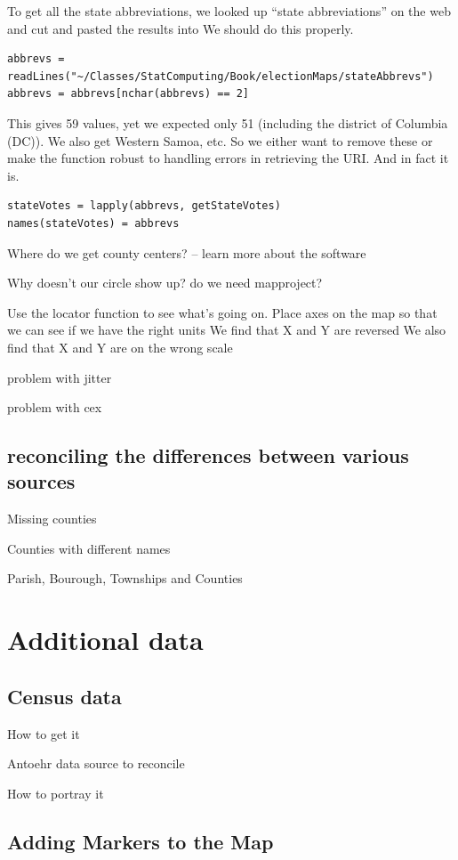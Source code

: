To get all the state abbreviations, we looked up ``state
abbreviations'' on the web and cut and pasted the results into
We should do this properly.
\begin{verbatim}
abbrevs = readLines("~/Classes/StatComputing/Book/electionMaps/stateAbbrevs")
abbrevs = abbrevs[nchar(abbrevs) == 2]
\end{verbatim}
This gives 59 values, yet we expected only 51 (including the
district of Columbia (DC)). We also get Western Samoa, etc.
So we either want to remove these or make the function
robust to handling errors in retrieving the URI.
And in fact it is.
\begin{verbatim}
stateVotes = lapply(abbrevs, getStateVotes)
names(stateVotes) = abbrevs
\end{verbatim}


Where do we get county centers?  -- learn more about the software

Why doesn't our circle show up?
do we need mapproject?

Use the locator function to see what's going on.
Place axes on the map so that we can see if we have the right units
We find that X and Y are reversed
We also find that X and Y are on the wrong scale

problem with jitter

problem with cex

\subsection{reconciling the differences between various sources}

Missing counties

Counties with different names

Parish, Bourough, Townships and Counties


\section{Additional data}

\subsection{Census data}
How to get it

Antoehr data source to reconcile

How to portray it

\subsection{Adding Markers to the Map}    

